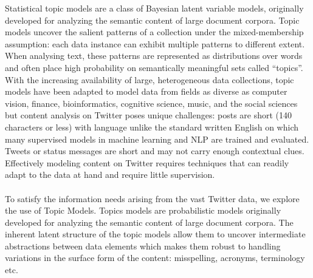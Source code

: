 \documentclass[10pt,a5paper,twoside]{article}
\begin{document}
Statistical topic models are a class of Bayesian latent variable models, originally developed for analyzing the semantic content of large document corpora. Topic models uncover the salient patterns of a collection under the mixed-membership assumption: each data instance can exhibit multiple patterns to different extent. When analysing text, these patterns are represented as distributions over words and often place high probability on semantically meaningful sets called “topics”. With the increasing availability of large, heterogeneous data collections, topic models have been adapted to model data from fields as diverse as computer vision, finance, bioinformatics, cognitive science, music, and the social sciences but content analysis on Twitter poses unique challenges: posts are short (140 characters or less) with language unlike the standard written English on which many supervised models in machine learning and NLP are trained and evaluated. Tweets or status messages are short and may not carry enough contextual clues. Effectively modeling content on Twitter requires techniques that can readily adapt to the data at hand and require little supervision.
\\\\
To satisfy the information needs arising from the vast Twitter data, we explore the use of Topic Models. Topics models are probabilistic models originally developed for analyzing the semantic content of large document corpora. The inherent latent structure of the topic models allow them to uncover intermediate abstractions between data elements which makes them robust to handling variations in the surface form of the content: misspelling, acronyms, terminology etc.
\end{document}
